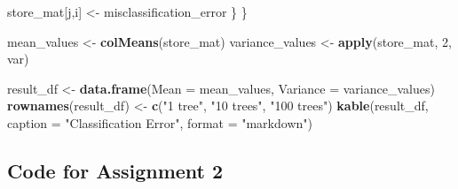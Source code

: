 \documentclass[
]{article}
\newenvironment{Shaded}{\begin{snugshade}}{\end{snugshade}}
\newcommand{\AttributeTok}[1]{\textcolor[rgb]{0.13,0.29,0.53}{#1}}
\newcommand{\DecValTok}[1]{\textcolor[rgb]{0.00,0.00,0.81}{#1}}
\newcommand{\FunctionTok}[1]{\textcolor[rgb]{0.13,0.29,0.53}{\textbf{#1}}}
\newcommand{\NormalTok}[1]{#1}
\newcommand{\OtherTok}[1]{\textcolor[rgb]{0.56,0.35,0.01}{#1}}
\newcommand{\StringTok}[1]{\textcolor[rgb]{0.31,0.60,0.02}{#1}}
\begin{document}
\begin{Shaded}
\begin{Highlighting}[]
\NormalTok{    store\_mat[j,i] }\OtherTok{\textless{}{-}}\NormalTok{ misclassification\_error}
\NormalTok{  \}}
\NormalTok{\}}

\NormalTok{mean\_values }\OtherTok{\textless{}{-}} \FunctionTok{colMeans}\NormalTok{(store\_mat)}
\NormalTok{variance\_values }\OtherTok{\textless{}{-}} \FunctionTok{apply}\NormalTok{(store\_mat, }\DecValTok{2}\NormalTok{, var)}

\NormalTok{result\_df }\OtherTok{\textless{}{-}} \FunctionTok{data.frame}\NormalTok{(}\AttributeTok{Mean =}\NormalTok{ mean\_values, }\AttributeTok{Variance =}\NormalTok{ variance\_values)}
\FunctionTok{rownames}\NormalTok{(result\_df) }\OtherTok{\textless{}{-}} \FunctionTok{c}\NormalTok{(}\StringTok{"1 tree"}\NormalTok{, }\StringTok{"10 trees"}\NormalTok{, }\StringTok{"100 trees"}\NormalTok{)}
\FunctionTok{kable}\NormalTok{(result\_df, }\AttributeTok{caption =} \StringTok{"Classification Error"}\NormalTok{, }\AttributeTok{format =} \StringTok{"markdown"}\NormalTok{)}
\end{Highlighting}
\end{Shaded}

\hypertarget{code-for-assignment-2}{%
\subsection{Code for Assignment 2}\label{code-for-assignment-2}}
\end{document}
